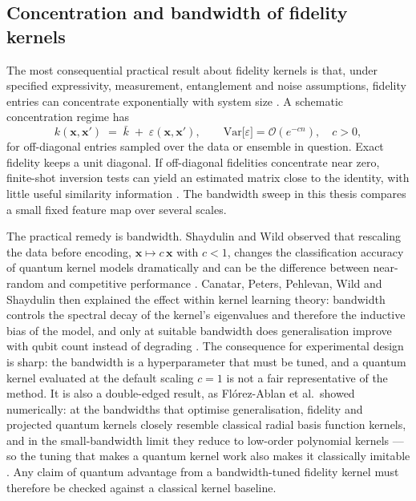 \documentclass[Thesis.tex]{subfiles}
\begin{document}
\subsection{Concentration and bandwidth of fidelity kernels}

The most consequential practical result about fidelity kernels is that, under specified expressivity, measurement, entanglement and noise assumptions,
fidelity entries can concentrate exponentially with system size
\cite{thanasilp2024exponential}. A schematic concentration regime has
\begin{equation}
  k(\mathbf{x},\mathbf{x}') \;=\; \bar{k} \;+\; \varepsilon(\mathbf{x},\mathbf{x}'),
  \qquad
  \mathrm{Var}\bigl[\varepsilon\bigr] = \mathcal{O}\!\left(e^{-c n}\right),\quad c>0,
  \label{eq2:concentration}
\end{equation}
for off-diagonal entries sampled over the data or ensemble in question.
Exact fidelity keeps a unit diagonal. If off-diagonal fidelities concentrate
near zero, finite-shot inversion tests can yield an estimated matrix close to
the identity, with little useful similarity information
\cite{thanasilp2024exponential}. The bandwidth sweep in this thesis compares
a small fixed feature map over several scales.

The practical remedy is bandwidth. Shaydulin and Wild observed that rescaling
the data before encoding, $\mathbf{x} \mapsto c\,\mathbf{x}$ with $c < 1$,
changes the classification accuracy of quantum kernel models dramatically and
can be the difference between near-random and competitive performance
\cite{shaydulin2022importance}. Canatar, Peters, Pehlevan, Wild and Shaydulin
then explained the effect within kernel learning theory: bandwidth controls the
spectral decay of the kernel's eigenvalues and therefore the
inductive bias of the model, and only at suitable bandwidth does generalisation
improve with qubit count instead of degrading \cite{canatar2023bandwidth}.
The consequence for experimental design is sharp: the bandwidth is a
hyperparameter that must be tuned, and a quantum kernel evaluated at the
default scaling $c = 1$ is not a fair representative of the method. It is also
a double-edged result, as Fl\'orez-Ablan et al.\ showed numerically: at the
bandwidths that optimise generalisation, fidelity and projected quantum kernels
closely resemble classical radial basis function kernels, and in the
small-bandwidth limit they reduce to low-order polynomial kernels ---
so the tuning that makes a quantum kernel work also makes it
classically imitable \cite{florezablan2025similarity}. Any claim of quantum
advantage from a bandwidth-tuned fidelity kernel must therefore be checked
against a classical kernel baseline.
\end{document}
